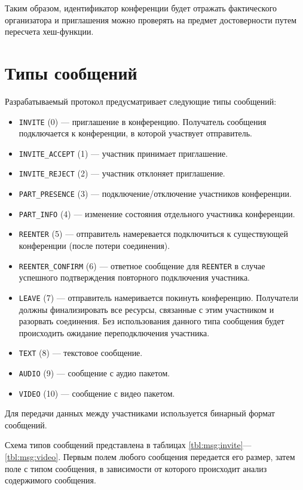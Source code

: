 Таким образом, идентификатор конференции будет отражать фактического организатора и приглашения можно проверять на предмет достоверности путем пересчета хеш-функции.

\section{Типы сообщений}

Разрабатываемый протокол предусматривает следующие типы сообщений:
\begin{itemize}[label=---]
    \item \texttt{INVITE} (0) --- приглашение в конференцию. Получатель сообщения подключается к конференции, в которой участвует отправитель.
    \item \texttt{INVITE\_ACCEPT} (1) --- участник принимает приглашение.
    \item \texttt{INVITE\_REJECT} (2) --- участник отклоняет приглашение.
    \item \texttt{PART\_PRESENCE} (3) --- подключение/отключение участников конференции.
    \item \texttt{PART\_INFO} (4) --- изменение состояния отдельного участника конференции.
    \item \texttt{REENTER} (5) --- отправитель намеревается подключиться к существующей конференции (после потери соединения).
    \item \texttt{REENTER\_CONFIRM} (6) --- ответное сообщение для \texttt{REENTER} в случае успешного подтверждения повторного подключения участника.
    \item \texttt{LEAVE} (7) --- отправитель намеривается покинуть конференцию. Получатели должны финализировать все ресурсы, связанные с этим участником и разорвать соединения. Без использования данного типа сообщения будет происходить ожидание переподключения участника.
    \item \texttt{TEXT} (8) --- текстовое сообщение.
    \item \texttt{AUDIO} (9) --- сообщение с аудио пакетом.
    \item \texttt{VIDEO} (10) --- сообщение с видео пакетом.
\end{itemize}

Для передачи данных между участниками используется бинарный формат сообщений.

Схема типов сообщений представлена в таблицах \ref{tbl:msg:invite}---\ref{tbl:msg:video}.
Первым полем любого сообщения передается его размер, затем поле с типом сообщения, в зависимости от которого происходит анализ содержимого сообщения.

